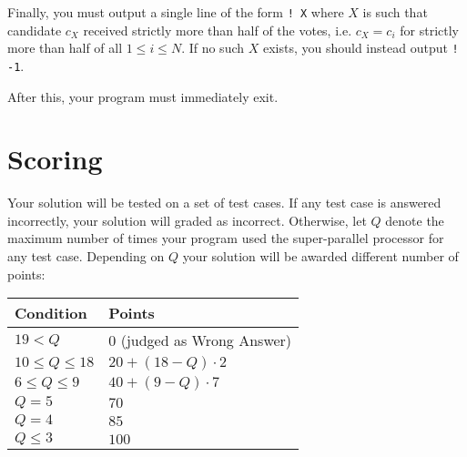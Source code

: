 Finally, you must output a single line of the form \texttt{! X} where $X$ is such that candidate $c_X$ received strictly more than half of the votes, i.e. $c_X = c_i$ for strictly more than half of all $1 \le i \le N$.
If no such $X$ exists, you should instead output \texttt{! -1}.

After this, your program must immediately exit.

\section*{Scoring}
Your solution will be tested on a set of test cases.
If any test case is answered incorrectly, your solution will graded as incorrect.
Otherwise, let $Q$ denote the maximum number of times your program used the super-parallel processor for any test case.
Depending on $Q$ your solution will be awarded different number of points:

\begin{center}
\begin{tabular}{|l|l|}
    \hline
    \textbf{Condition} & \textbf{Points} \\ \hline
    $19 < Q$ & $0$ (judged as Wrong Answer)\\ \hline
    $10 \le Q \le 18$ & $20 + (18 - Q) \cdot 2$ \\ \hline
    $6 \le Q \le 9$ & $40 + (9 - Q) \cdot 7$ \\ \hline
    $Q = 5$ & $70$ \\ \hline
    $Q = 4$ & $85$ \\ \hline
    $Q \le 3$ & $100$ \\ \hline
\end{tabular}
\end{center}
